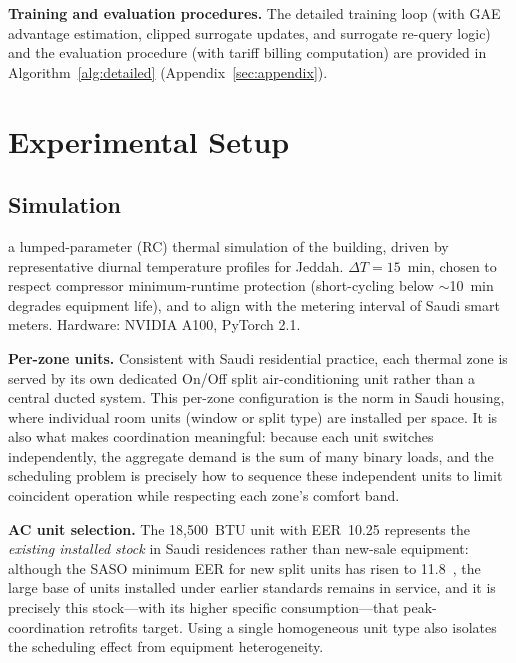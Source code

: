 \documentclass[12pt,a4paper]{article}
\begin{document}
\textbf{Training and evaluation procedures.} The detailed training loop (with GAE advantage estimation, clipped surrogate updates, and surrogate re-query logic) and the evaluation procedure (with tariff billing computation) are provided in Algorithm~\ref{alg:detailed} (Appendix~\ref{sec:appendix}).

\section{Experimental Setup}
\label{sec:setup}

\subsection{Simulation}

a lumped-parameter (RC) thermal simulation of the building, driven by representative diurnal temperature profiles for Jeddah. $\Delta T = 15$~min, chosen to respect compressor minimum-runtime protection (short-cycling below $\sim$10~min degrades equipment life), and to align with the metering interval of Saudi smart meters. Hardware: NVIDIA A100, PyTorch 2.1.

\textbf{Per-zone units.} Consistent with Saudi residential practice, each thermal zone is served by its own dedicated On/Off split air-conditioning unit rather than a central ducted system. This per-zone configuration is the norm in Saudi housing, where individual room units (window or split type) are installed per space. It is also what makes coordination meaningful: because each unit switches independently, the aggregate demand is the sum of many binary loads, and the scheduling problem is precisely how to sequence these independent units to limit coincident operation while respecting each zone's comfort band.

\textbf{AC unit selection.} The 18{,}500~BTU unit with EER~10.25 represents the \textit{existing installed stock} in Saudi residences rather than new-sale equipment: although the SASO minimum EER for new split units has risen to 11.8~\cite{ref2}, the large base of units installed under earlier standards remains in service, and it is precisely this stock---with its higher specific consumption---that peak-coordination retrofits target. Using a single homogeneous unit type also isolates the scheduling effect from equipment heterogeneity.
\end{document}
